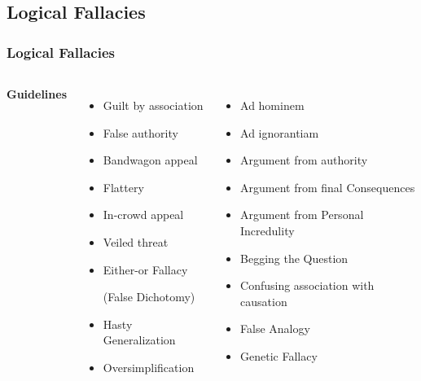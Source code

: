 \documentclass{beamer}
\begin{document}
\subsection{Logical Fallacies}
\begin{frame}
\frametitle{Logical Fallacies}
\begin{columns}[c]

\textbf{Guidelines}
\begin{itemize}
\item Guilt by association
\item False authority
\item Bandwagon appeal
\item Flattery
\item In-crowd appeal
\item Veiled threat
\item Either-or Fallacy 

(False Dichotomy)
\item Hasty Generalization
\item Oversimplification
\end{itemize}

\begin{itemize}
\item Ad hominem
\item Ad ignorantiam
\item Argument from authority
\item Argument from final Consequences
\item Argument from Personal Incredulity
\item Begging the Question
\item Confusing association with causation
\item False Analogy
\item Genetic Fallacy
\end{itemize}
\end{columns}
\end{frame}
\end{document}
